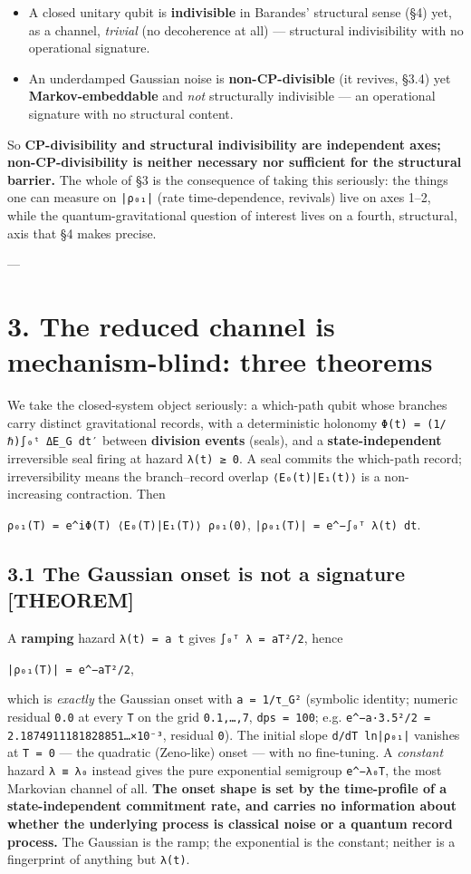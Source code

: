 \documentclass[11pt]{article}
\begin{document}
\begin{itemize}
\item A closed unitary qubit is \textbf{indivisible} in Barandes' structural sense (§4) yet, as a channel, \emph{trivial} (no decoherence at all) — structural indivisibility with no operational signature.
\item An underdamped Gaussian noise is \textbf{non-CP-divisible} (it revives, §3.4) yet \textbf{Markov-embeddable} and \emph{not} structurally indivisible — an operational signature with no structural content.
\end{itemize}
So \textbf{CP-divisibility and structural indivisibility are independent axes; non-CP-divisibility is neither necessary nor sufficient for the structural barrier.} The whole of §3 is the consequence of taking this seriously: the things one can measure on \texttt{|ρ₀₁|} (rate time-dependence, revivals) live on axes 1–2, while the quantum-gravitational question of interest lives on a fourth, structural, axis that §4 makes precise.

---

\section*{3. The reduced channel is mechanism-blind: three theorems}
We take the closed-system object seriously: a which-path qubit whose branches carry distinct gravitational records, with a deterministic holonomy \texttt{Φ(t) = (1/ℏ)∫₀ᵗ ΔE\_G dt′} between \textbf{division events} (seals), and a \textbf{state-independent} irreversible seal firing at hazard \texttt{λ(t) ≥ 0}. A seal commits the which-path record; irreversibility means the branch–record overlap \texttt{⟨E₀(t)|E₁(t)⟩} is a non-increasing contraction. Then

\texttt{ρ₀₁(T) = e\textasciicircum{}{iΦ(T)} ⟨E₀(T)|E₁(T)⟩ ρ₀₁(0)},  \texttt{|ρ₀₁(T)| = e\textasciicircum{}{−∫₀ᵀ λ(t) dt}}.

\subsection*{3.1 The Gaussian onset is not a signature [THEOREM]}
A \textbf{ramping} hazard \texttt{λ(t) = a t} gives \texttt{∫₀ᵀ λ = aT²/2}, hence

\texttt{|ρ₀₁(T)| = e\textasciicircum{}{−aT²/2}},

which is \emph{exactly} the Gaussian onset with \texttt{a = 1/τ\_G²} (symbolic identity; numeric residual \texttt{0.0} at every \texttt{T} on the grid \texttt{{0.1,…,7}}, \texttt{dps = 100}; e.g. \texttt{e\textasciicircum{}{−a·3.5²/2} = 2.1874911181828851…×10⁻³}, residual \texttt{0}). The initial slope \texttt{d/dT ln|ρ₀₁|} vanishes at \texttt{T = 0} — the quadratic (Zeno-like) onset — with no fine-tuning. A \emph{constant} hazard \texttt{λ ≡ λ₀} instead gives the pure exponential semigroup \texttt{e\textasciicircum{}{−λ₀T}}, the most Markovian channel of all. \textbf{The onset shape is set by the time-profile of a state-independent commitment rate, and carries no information about whether the underlying process is classical noise or a quantum record process.} The Gaussian is the ramp; the exponential is the constant; neither is a fingerprint of anything but \texttt{λ(t)}.
\end{document}
